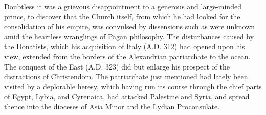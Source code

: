 Doubtless it was a grievous disappointment to a generous and
large-minded prince, to discover that the Church itself, from which he
had looked for the consolidation of his empire, was convulsed by
dissensions such as were unknown amid the heartless wranglings of
Pagan philosophy. The disturbances caused by the Donatists, which his
acquisition of Italy (A.D. 312) had opened upon
his view, extended from the borders of the Alexandrian patriarchate to
the ocean. The conquest of the East (A.D. 323)
did but enlarge his prospect of the distractions of Christendom. The
patriarchate just mentioned had lately been visited by a deplorable
heresy, which having run its course through the chief parts of Egypt,
Lybia, and Cyrenaica, had attacked Palestine and Syria, and spread
thence into the dioceses of Asia Minor and the Lydian Proconsulate.

